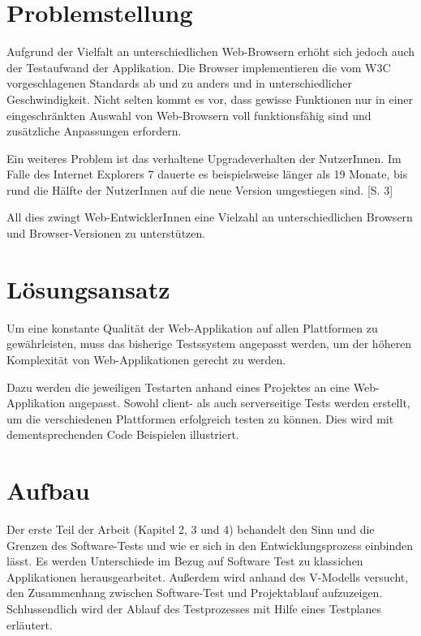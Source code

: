 \documentclass[a4paper,bibtotoc,oneside]{scrbook}
\begin{document}
\section{Problemstellung}
Aufgrund der Vielfalt an unterschiedlichen Web-Browsern erhöht sich jedoch auch der Testaufwand der Applikation. Die Browser implementieren die vom W3C vorgeschlagenen Standards ab und zu anders und in unterschiedlicher Geschwindigkeit. Nicht selten kommt es vor, dass gewisse Funktionen nur in einer eingeschränkten Auswahl von Web-Browsern voll funktionsfähig sind und zusätzliche Anpassungen erfordern. \cite{caniuse}

Ein weiteres Problem ist das verhaltene Upgradeverhalten der NutzerInnen. Im Falle des Internet Explorers 7 dauerte es beispielsweise länger als 19 Monate, bis rund die Hälfte der NutzerInnen auf die neue Version umgestiegen sind. \cite{insecure}[S. 3]

All dies zwingt Web-EntwicklerInnen eine Vielzahl an unterschiedlichen Browsern und Browser-Versionen zu unterstützen.


\section{Lösungsansatz}
Um eine konstante Qualität der Web-Applikation auf allen Plattformen zu gewährleisten, muss das bisherige Testssystem angepasst werden, um der höheren Komplexität von Web-Applikationen gerecht zu werden. 

Dazu werden die jeweiligen Testarten anhand eines Projektes an eine Web-Applikation angepasst. Sowohl client- als auch serverseitige Tests werden erstellt, um die verschiedenen Plattformen erfolgreich testen zu können. Dies wird mit dementsprechenden Code Beispielen illustriert.

\newpage

\section{Aufbau}
Der erste Teil der Arbeit (Kapitel 2, 3 und 4) behandelt den Sinn und die Grenzen des Software-Tests und wie er sich in den Entwicklungsprozess einbinden lässt. Es werden Unterschiede im Bezug auf Software Test zu klassichen Applikationen herausgearbeitet. Außerdem wird anhand des V-Modells versucht, den Zusammenhang zwischen Software-Test und Projektablauf aufzuzeigen. Schlussendlich wird der Ablauf des Testprozesses mit Hilfe eines Testplanes erläutert.
\end{document}

